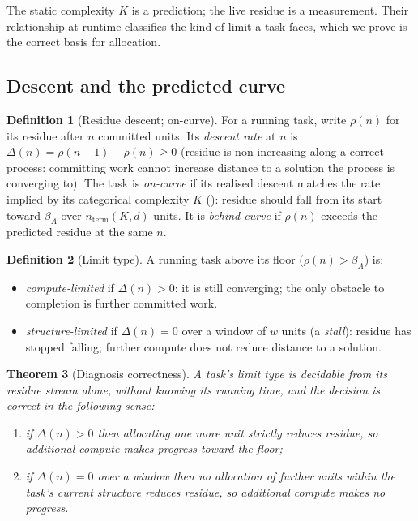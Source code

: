 \documentclass[twocolumn,10pt,a4paper]{article}
\theoremstyle{thmstyle}
\newtheorem{theorem}{Theorem}[section]
\theoremstyle{definition}
\newtheorem{definition}[theorem]{Definition}
\theoremstyle{remark}
\newcommand{\floor}{\beta}
\newcommand{\res}{\rho}
\begin{document}
The static complexity $K$ is a prediction; the live residue is a
measurement. Their relationship at runtime classifies the kind of limit a
task faces, which we prove is the correct basis for allocation.

\subsection{Descent and the predicted curve}

\begin{definition}[Residue descent; on-curve]
\label{def:descent}
For a running task, write $\res(n)$ for its residue after $n$ committed
units. Its \emph{descent rate} at $n$ is
$\Delta(n)=\res(n-1)-\res(n)\ge 0$ (residue is non-increasing along a
correct process: committing work cannot increase distance to a solution
the process is converging to). The task is \emph{on-curve} if its
realised descent matches the rate implied by its categorical complexity
$K$ (): residue should fall from its start toward
$\floor_A$ over $n_{\mathrm{term}}(K,d)$ units. It is \emph{behind curve}
if $\res(n)$ exceeds the predicted residue at the same $n$.
\end{definition}

\begin{definition}[Limit type]
\label{def:limit}
A running task above its floor ($\res(n)>\floor_A$) is:
\begin{itemize}[leftmargin=1.4em,itemsep=2pt]
\item \emph{compute-limited} if $\Delta(n)>0$: it is still converging;
the only obstacle to completion is further committed work.
\item \emph{structure-limited} if $\Delta(n)=0$ over a window of $w$
units (a \emph{stall}): residue has stopped falling; further compute does
not reduce distance to a solution.
\end{itemize}
\end{definition}

\begin{theorem}[Diagnosis correctness]
\label{thm:diagnosis}
A task's limit type is decidable from its residue stream alone, without
knowing its running time, and the decision is correct in the following
sense:
\begin{enumerate}[label=\textup{(\roman*)},leftmargin=2.2em,itemsep=2pt]
\item if $\Delta(n)>0$ then allocating one more unit strictly reduces
residue, so additional compute makes progress toward the floor;
\item if $\Delta(n)=0$ over a window then no allocation of further
units within the task's current structure reduces residue, so additional
compute makes no progress.
\end{enumerate}
\end{theorem}
\end{document}
